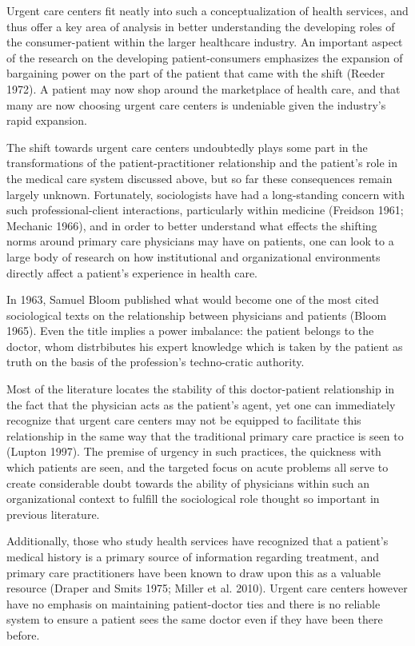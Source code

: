 \documentclass[12pt,twoside]{reedthesis}
\begin{document}
  Urgent care centers fit neatly into such a conceptualization of health
  services, and thus offer a key area of analysis in better understanding
  the developing roles of the consumer-patient within the larger
  healthcare industry. An important aspect of the research on the
  developing patient-consumers emphasizes the expansion of bargaining
  power on the part of the patient that came with the shift (Reeder 1972).
  A patient may now shop around the marketplace of health care, and that
  many are now choosing urgent care centers is undeniable given the
  industry's rapid expansion.
  
  The shift towards urgent care centers undoubtedly plays some part in the
  transformations of the patient-practitioner relationship and the
  patient's role in the medical care system discussed above, but so far
  these consequences remain largely unknown. Fortunately, sociologists
  have had a long-standing concern with such professional-client
  interactions, particularly within medicine (Freidson 1961; Mechanic
  1966), and in order to better understand what effects the shifting norms
  around primary care physicians may have on patients, one can look to a
  large body of research on how institutional and organizational
  environments directly affect a patient's experience in health care.
  
  In 1963, Samuel Bloom published what would become one of the most cited
  sociological texts on the relationship between physicians and patients
  (Bloom 1965). Even the title implies a power imbalance: the patient
  belongs to the doctor, whom distrbibutes his expert knowledge which is
  taken by the patient as truth on the basis of the profession's
  techno-cratic authority.
  
  Most of the literature locates the stability of this doctor-patient
  relationship in the fact that the physician acts as the patient's agent,
  yet one can immediately recognize that urgent care centers may not be
  equipped to facilitate this relationship in the same way that the
  traditional primary care practice is seen to (Lupton 1997). The premise
  of urgency in such practices, the quickness with which patients are
  seen, and the targeted focus on acute problems all serve to create
  considerable doubt towards the ability of physicians within such an
  organizational context to fulfill the sociological role thought so
  important in previous literature.
  
  Additionally, those who study health services have recognized that a
  patient's medical history is a primary source of information regarding
  treatment, and primary care practitioners have been known to draw upon
  this as a valuable resource (Draper and Smits 1975; Miller et al. 2010).
  Urgent care centers however have no emphasis on maintaining
  patient-doctor ties and there is no reliable system to ensure a patient
  sees the same doctor even if they have been there before.
  
\end{document}
